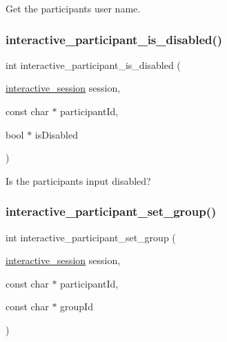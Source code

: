 Get the participant\textquotesingle{}s user name. 

\mbox{\label{group___interactivity_gab2098ae9ba695cc55849978d5a65052f}} 
\subsubsection{\texorpdfstring{interactive\+\_\+participant\+\_\+is\+\_\+disabled()}{interactive\_participant\_is\_disabled()}}
{\footnotesize\ttfamily int interactive\+\_\+participant\+\_\+is\+\_\+disabled (\begin{DoxyParamCaption}\item[{\mbox{\hyperlink{group___interactivity_ga6d8819d38b8dc8994a2299cf22a65a31}{interactive\+\_\+session}}}]{session,  }\item[{const char $\ast$}]{participant\+Id,  }\item[{bool $\ast$}]{is\+Disabled }\end{DoxyParamCaption})}



Is the participant\textquotesingle{}s input disabled? 

\mbox{\label{group___interactivity_ga5d75a20e499ba477345516d3f3de7dc7}} 
\subsubsection{\texorpdfstring{interactive\+\_\+participant\+\_\+set\+\_\+group()}{interactive\_participant\_set\_group()}}
{\footnotesize\ttfamily int interactive\+\_\+participant\+\_\+set\+\_\+group (\begin{DoxyParamCaption}\item[{\mbox{\hyperlink{group___interactivity_ga6d8819d38b8dc8994a2299cf22a65a31}{interactive\+\_\+session}}}]{session,  }\item[{const char $\ast$}]{participant\+Id,  }\item[{const char $\ast$}]{group\+Id }\end{DoxyParamCaption})}



